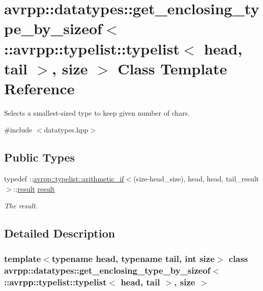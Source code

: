 \hypertarget{classavrpp_1_1datatypes_1_1get__enclosing__type__by__sizeof_3_01_1_1avrpp_1_1typelist_1_1typelis9fc0eb4240be8e1020d3e8f1e14a8622}{
\section{avrpp::datatypes::get\_\-enclosing\_\-type\_\-by\_\-sizeof$<$ ::avrpp::typelist::typelist$<$ head, tail $>$, size $>$ Class Template Reference}
\label{classavrpp_1_1datatypes_1_1get__enclosing__type__by__sizeof_3_01_1_1avrpp_1_1typelist_1_1typelis9fc0eb4240be8e1020d3e8f1e14a8622}
}


Selects a smallest-\/sized type to keep given number of chars.  




{\ttfamily \#include $<$datatypes.hpp$>$}

\subsection*{Public Types}
\begin{DoxyCompactItemize}
\item 
typedef ::\hyperlink{classavrpp_1_1typelist_1_1arithmetic__if}{avrpp::typelist::arithmetic\_\-if}$<$(size-\/head\_\-size), head, head, tail\_\-result $>$::\hyperlink{classavrpp_1_1datatypes_1_1get__enclosing__type__by__sizeof_3_01_1_1avrpp_1_1typelist_1_1typelis9fc0eb4240be8e1020d3e8f1e14a8622_a36a57140c544482d12ea8698b27126d2}{result} \hyperlink{classavrpp_1_1datatypes_1_1get__enclosing__type__by__sizeof_3_01_1_1avrpp_1_1typelist_1_1typelis9fc0eb4240be8e1020d3e8f1e14a8622_a36a57140c544482d12ea8698b27126d2}{result}
\begin{DoxyCompactList}\small\item\em The result. \item\end{DoxyCompactList}\end{DoxyCompactItemize}


\subsection{Detailed Description}
\subsubsection*{template$<$typename head, typename tail, int size$>$ class avrpp::datatypes::get\_\-enclosing\_\-type\_\-by\_\-sizeof$<$ ::avrpp::typelist::typelist$<$ head, tail $>$, size $>$}


